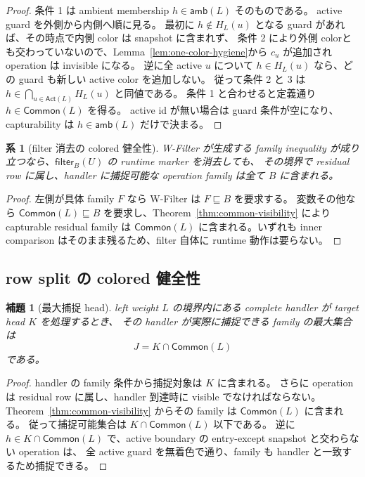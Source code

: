\documentclass[uplatex,dvipdfmx,a4paper,10.5pt]{jsarticle}
\theoremstyle{jpplain}
\newtheorem{lemma}[definition]{補題}
\newtheorem{corollary}[definition]{系}
\newcommand{\Common}{\mathsf{Common}}
\newcommand{\Filter}[2]{\mathsf{filter}_{#1}(#2)}
\newcommand{\amb}{\mathsf{amb}}
\begin{document}
\begin{proof}
条件 1 は ambient membership $h\in\amb(L)$ そのものである。
active guard を外側から内側へ順に見る。
最初に $h\notin H_L(u)$ となる guard があれば、その時点で内側 color は snapshot に含まれず、
条件 2 により外側 colorとも交わっていないので、Lemma~\ref{lem:one-color-hygiene}から $c_u$ が追加され operation は invisible になる。
逆に全 active $u$ について $h\in H_L(u)$ なら、どの guard も新しい active color を追加しない。
従って条件 2 と 3 は
$h\in\bigcap_{u\in\mathsf{Act}(L)}H_L(u)$ と同値である。
条件 1 と合わせると定義通り $h\in\Common(L)$ を得る。
active id が無い場合は guard 条件が空になり、capturability は $h\in\amb(L)$ だけで決まる。
\end{proof}

\begin{corollary}[filter 消去の colored 健全性]\label{cor:filter-erasure}
W-Filter が生成する family inequality が成り立つなら、$\Filter{B}{U}$ の runtime marker を消去しても、
その境界で residual row に属し、handler に捕捉可能な operation family は全て $B$ に含まれる。
\end{corollary}

\begin{proof}
左側が具体 family $F$ なら W-Filter は $F\sqsubseteq B$ を要求する。
変数その他なら $\Common(L)\sqsubseteq B$ を要求し、Theorem~\ref{thm:common-visibility} により capturable residual family は
$\Common(L)$ に含まれる。いずれも inner comparison はそのまま残るため、filter 自体に runtime 動作は要らない。
\end{proof}

\subsection{row split の colored 健全性}

\begin{lemma}[最大捕捉 head]\label{lem:max-colored-head}
left weight $L$ の境界内にある complete handler が target head $K$ を処理するとき、
その handler が実際に捕捉できる family の最大集合は
\[
  J=K\cap\Common(L)
\]
である。
\end{lemma}

\begin{proof}
handler の family 条件から捕捉対象は $K$ に含まれる。
さらに operation は residual row に属し、handler 到達時に visible でなければならない。
Theorem~\ref{thm:common-visibility} からその family は $\Common(L)$ に含まれる。
従って捕捉可能集合は $K\cap\Common(L)$ 以下である。
逆に $h\in K\cap\Common(L)$ で、active boundary の entry-except snapshot と交わらない operation は、
全 active guard を無着色で通り、family も handler と一致するため捕捉できる。
\end{proof}
\end{document}
